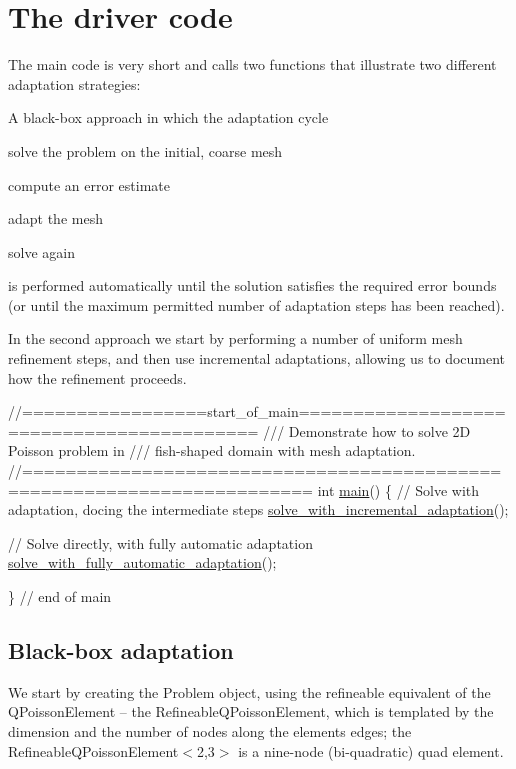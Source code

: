 

\hypertarget{index_main}{}\section{The driver code}\label{index_main}
The main code is very short and calls two functions that illustrate two different adaptation strategies\+:
\begin{DoxyItemize}
\item A black-\/box approach in which the adaptation cycle
\begin{DoxyEnumerate}
\item solve the problem on the initial, coarse mesh
\item compute an error estimate
\item adapt the mesh
\item solve again
\end{DoxyEnumerate}is performed automatically until the solution satisfies the required error bounds (or until the maximum permitted number of adaptation steps has been reached).
\item In the second approach we start by performing a number of uniform mesh refinement steps, and then use incremental adaptations, allowing us to document how the refinement proceeds.
\end{DoxyItemize} 
\begin{DoxyCodeInclude}
\textcolor{comment}{//=================start\_of\_main==========================================}
\textcolor{comment}{/// Demonstrate how to solve 2D Poisson problem in }
\textcolor{comment}{}\textcolor{comment}{/// fish-shaped domain with mesh adaptation.}
\textcolor{comment}{}\textcolor{comment}{//========================================================================}
\textcolor{keywordtype}{int} \hyperlink{fish__poisson_8cc_ae66f6b31b5ad750f1fe042a706a4e3d4}{main}()
\{
 \textcolor{comment}{// Solve with adaptation, docing the intermediate steps}
 \hyperlink{fish__poisson_8cc_a9f5ae2c03a7f02e61857d322177ce5d5}{solve\_with\_incremental\_adaptation}();

 \textcolor{comment}{// Solve directly, with fully automatic adaptation}
 \hyperlink{fish__poisson_8cc_a79a1cfcdcd821bd277276d163b85acfb}{solve\_with\_fully\_automatic\_adaptation}();

\} \textcolor{comment}{// end of main}

\end{DoxyCodeInclude}




\hypertarget{index_black_box}{}\subsection{Black-\/box adaptation}\label{index_black_box}
We start by creating the Problem object, using the refineable equivalent of the {\ttfamily Q\+Poisson\+Element} -- the {\ttfamily Refineable\+Q\+Poisson\+Element}, which is templated by the dimension and the number of nodes along the element\textquotesingle{}s edges; the {\ttfamily Refineable\+Q\+Poisson\+Element$<$2,3$>$} is a nine-\/node (bi-\/quadratic) quad element.

